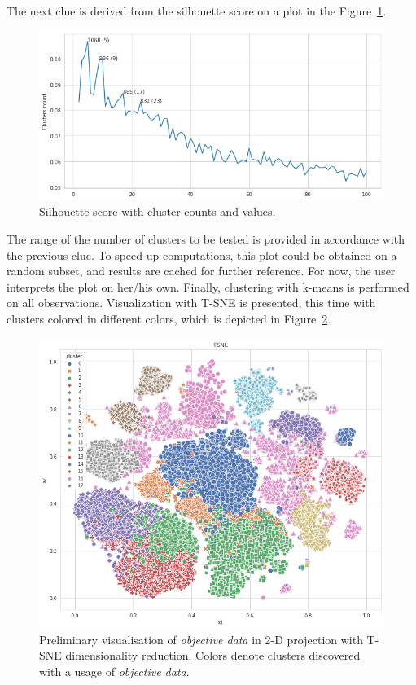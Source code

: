 \documentclass[
 twocolumn,
 hf,
]{ceurart}
\begin{document}
The next clue is derived from the silhouette score on a plot in the Figure~\ref{fig:silhouette}.
\begin{figure}[h!]
  \centering
  \includegraphics[width=\linewidth]{silhouette-100}
  \caption{Silhouette score with cluster counts and values.}
  \label{fig:silhouette}
\end{figure}
The range of the number of clusters to be tested is provided in accordance with the previous clue.
To speed-up computations, this plot could be obtained on a random subset, and results are cached for further reference.
For now, the user interprets the plot on her/his own.
Finally, clustering with k-means is performed on all observations.
Visualization with T-SNE is presented, this time with clusters colored in different colors, which is depicted in Figure~\ref{fig:kmeans}.
\begin{figure}[h!]
  \centering
  \includegraphics[width=\linewidth]{example1-clustering-products-fashion-tex/output_59_0}
  \caption{Preliminary visualisation of \textit{objective data} in 2-D projection with T-SNE dimensionality reduction. Colors denote clusters discovered with a usage of \textit{objective data}.}
  \label{fig:kmeans}
\end{figure}
\end{document}
